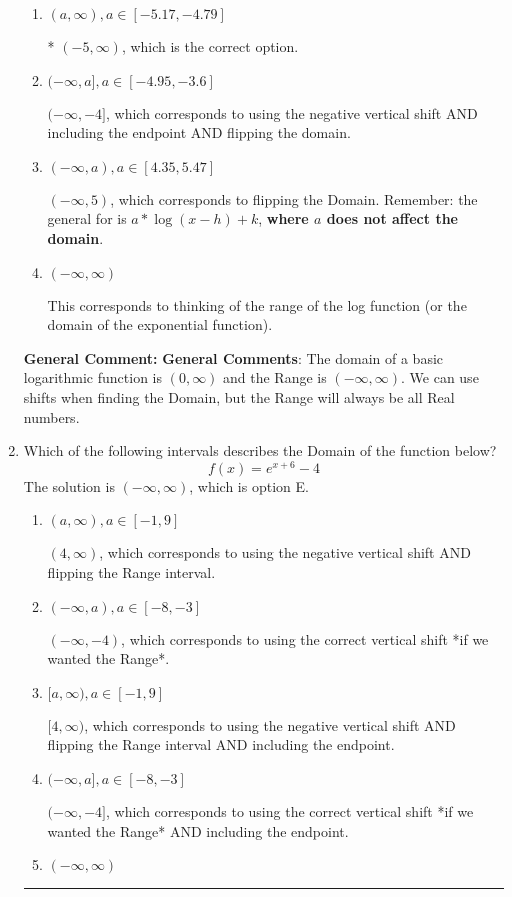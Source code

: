 \documentclass{extbook}[14pt]
\newcommand{\litem}[1]{\item #1

\rule{\textwidth}{0.4pt}}
\begin{document}
\begin{enumerate}
{\begin{enumerate}[label=\Alph*.]
$[4, \infty)$, which corresponds to using the vertical shift when shifting the Domain AND including the endpoint.
\item \( (a, \infty), a \in [-5.17, -4.79] \)

* $(-5, \infty)$, which is the correct option.
\item \( (-\infty, a], a \in [-4.95, -3.6] \)

$(-\infty, -4]$, which corresponds to using the negative vertical shift AND including the endpoint AND flipping the domain.
\item \( (-\infty, a), a \in [4.35, 5.47] \)

$(-\infty, 5)$, which corresponds to flipping the Domain. Remember: the general for is $a*\log(x-h)+k$, \textbf{where $a$ does not affect the domain}.
\item \( (-\infty, \infty) \)

This corresponds to thinking of the range of the log function (or the domain of the exponential function).
\end{enumerate}

\textbf{General Comment:} \textbf{General Comments}: The domain of a basic logarithmic function is $(0, \infty)$ and the Range is $(-\infty, \infty)$. We can use shifts when finding the Domain, but the Range will always be all Real numbers.
}
\litem{
Which of the following intervals describes the Domain of the function below?
\[ f(x) = e^{x+6}-4 \]
The solution is \( (-\infty, \infty) \), which is option E.\begin{enumerate}[label=\Alph*.]
\item \( (a, \infty), a \in [-1, 9] \)

$(4, \infty)$, which corresponds to using the negative vertical shift AND flipping the Range interval.
\item \( (-\infty, a), a \in [-8, -3] \)

$(-\infty, -4)$, which corresponds to using the correct vertical shift *if we wanted the Range*.
\item \( [a, \infty), a \in [-1, 9] \)

$[4, \infty)$, which corresponds to using the negative vertical shift AND flipping the Range interval AND including the endpoint.
\item \( (-\infty, a], a \in [-8, -3] \)

$(-\infty, -4]$, which corresponds to using the correct vertical shift *if we wanted the Range* AND including the endpoint.
\item \( (-\infty, \infty) \)


\end{enumerate}}
\end{enumerate}
\end{document}
